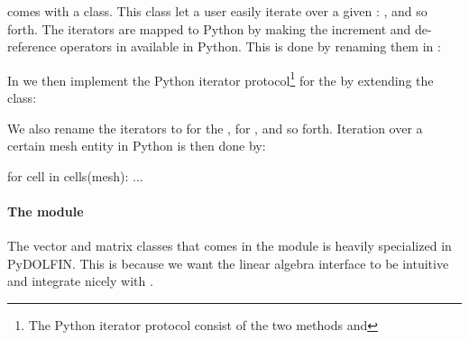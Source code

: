 \dolfin comes with a \-\- class. This class let a user easily iterate over a given : ,  and so forth. The iterators are mapped to Python by making the increment and de-reference operators in  available in Python. This is done by renaming them in :
\begin{c++}
\end{c++}
In  we then implement the Python iterator protocol\footnote{The Python iterator protocol consist of the two methods  and } for the \-\- by extending the class:
We also rename the iterators to  for the ,  for , and so forth. Iteration over a certain mesh entity in Python is then done by:
\begin{python}
for cell in cells(mesh):
    ...
\end{python}

\paragraph{The  module}
The vector and matrix classes that comes in the  module is heavily specialized in PyDOLFIN. This is because we want the linear algebra interface to be intuitive and integrate nicely with \numpy.

